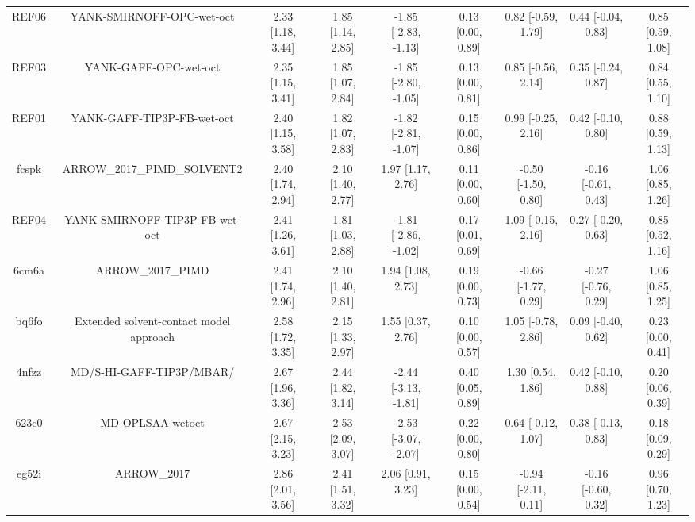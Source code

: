 \documentclass{article}
\begin{document}
\begin{center}
\begin{longtable}{|ccccccccc|}
 REF06 &                          YANK-SMIRNOFF-OPC-wet-oct &  2.33 [1.18, 3.44] &  1.85 [1.14, 2.85] &  -1.85 [-2.83, -1.13] &  0.13 [0.00, 0.89] &   0.82 [-0.59, 1.79] &   0.44 [-0.04, 0.83] &     0.85 [0.59, 1.08] \\
 REF03 &                              YANK-GAFF-OPC-wet-oct &  2.35 [1.15, 3.41] &  1.85 [1.07, 2.84] &  -1.85 [-2.80, -1.05] &  0.13 [0.00, 0.81] &   0.85 [-0.56, 2.14] &   0.35 [-0.24, 0.87] &     0.84 [0.55, 1.10] \\
 REF01 &                         YANK-GAFF-TIP3P-FB-wet-oct &  2.40 [1.15, 3.58] &  1.82 [1.07, 2.83] &  -1.82 [-2.81, -1.07] &  0.15 [0.00, 0.86] &   0.99 [-0.25, 2.16] &   0.42 [-0.10, 0.80] &     0.88 [0.59, 1.13] \\
 fcspk &                        ARROW\_2017\_PIMD\_SOLVENT2 &  2.40 [1.74, 2.94] &  2.10 [1.40, 2.77] &     1.97 [1.17, 2.76] &  0.11 [0.00, 0.60] &  -0.50 [-1.50, 0.80] &  -0.16 [-0.61, 0.43] &     1.06 [0.85, 1.26] \\
 REF04 &                     YANK-SMIRNOFF-TIP3P-FB-wet-oct &  2.41 [1.26, 3.61] &  1.81 [1.03, 2.88] &  -1.81 [-2.86, -1.02] &  0.17 [0.01, 0.69] &   1.09 [-0.15, 2.16] &   0.27 [-0.20, 0.63] &     0.85 [0.52, 1.16] \\
 6cm6a &                                  ARROW\_2017\_PIMD &  2.41 [1.74, 2.96] &  2.10 [1.40, 2.81] &     1.94 [1.08, 2.73] &  0.19 [0.00, 0.73] &  -0.66 [-1.77, 0.29] &  -0.27 [-0.76, 0.29] &     1.06 [0.85, 1.25] \\
 bq6fo &            Extended solvent-contact model approach &  2.58 [1.72, 3.35] &  2.15 [1.33, 2.97] &     1.55 [0.37, 2.76] &  0.10 [0.00, 0.57] &   1.05 [-0.78, 2.86] &   0.09 [-0.40, 0.62] &     0.23 [0.00, 0.41] \\
 4nfzz &                           MD/S-HI-GAFF-TIP3P/MBAR/ &  2.67 [1.96, 3.36] &  2.44 [1.82, 3.14] &  -2.44 [-3.13, -1.81] &  0.40 [0.05, 0.89] &    1.30 [0.54, 1.86] &   0.42 [-0.10, 0.88] &     0.20 [0.06, 0.39] \\
 623c0 &                                   MD-OPLSAA-wetoct &  2.67 [2.15, 3.23] &  2.53 [2.09, 3.07] &  -2.53 [-3.07, -2.07] &  0.22 [0.00, 0.80] &   0.64 [-0.12, 1.07] &   0.38 [-0.13, 0.83] &     0.18 [0.09, 0.29] \\
 eg52i &                                        ARROW\_2017 &  2.86 [2.01, 3.56] &  2.41 [1.51, 3.32] &     2.06 [0.91, 3.23] &  0.15 [0.00, 0.54] &  -0.94 [-2.11, 0.11] &  -0.16 [-0.60, 0.32] &     0.96 [0.70, 1.23] \\

\end{longtable}
\end{center}
\end{document}
